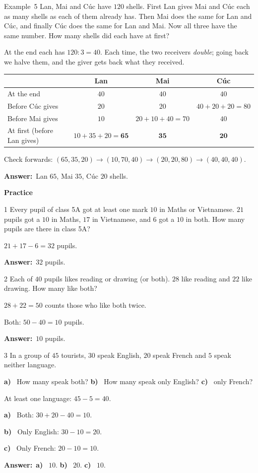 \documentclass[11pt]{article}
\newif\ifsol \solfalse
\renewcommand{\arraystretch}{1.35}
\providecommand{\AnsWord}{Đáp số}
\newcommand{\dapso}[1]{\par\textbf{\AnsWord:}\ #1}
\newcommand{\guide}{\par\vspace{4pt}{\bfseries\color{tmBlue}\GuideWord}\par\vspace{3pt}\nopagebreak}
\newcommand{\probsol}[1]{%
  \begin{lrbox}{\solmeasure}\begin{minipage}{\dimexpr\linewidth-24pt\relax}#1\end{minipage}\end{lrbox}%
  \ifsol
    \begin{solbox}#1\end{solbox}%
  \else
    \setlength{\solht}{\dimexpr\ht\solmeasure+\dp\solmeasure+0.85cm\relax}%
    \ifdim\solht<1.35cm\setlength{\solht}{1.35cm}\fi
    \begin{tcolorbox}[colback=white,colframe=Line,boxrule=0.8pt,arc=5pt,
      left=8pt,right=8pt,top=4pt,bottom=4pt,height=\solht]{\footnotesize\color{Slate}\itshape\WorkWord}\end{tcolorbox}%
  \fi}
\newcommand{\dividerbar}[1]{\par\vspace{0.6em}\noindent
  \begin{tcolorbox}[enhanced,frame hidden,interior hidden,borderline west={5pt}{0pt}{ProbBlue},
    colback=white,left=12pt,right=12pt,top=5pt,bottom=5pt,arc=4pt]
  {\large\bfseries\color{ProbBlue} #1}\end{tcolorbox}\vspace{0.4em}}
\newcommand{\pa}[1]{\textbf{#1)}\ }
\newcommand{\gap}{\vspace{0.3cm}}
\def\GuideWord{Guided solution.}
\def\WorkWord{Your work:}
\def\AnsWord{Answer}
\def\ExWord{Example}
\begin{document}
\gap
\begin{exbox}{\ExWord\ 5}
Lan, Mai and Cúc have $120$ shells. First Lan gives Mai and Cúc each as many shells as each of them already has. Then Mai does the same for Lan and Cúc, and finally Cúc does the same for Lan and Mai. Now all three have the same number. How many shells did each have at first?
\guide
At the end each has $120:3=40$. Each time, the two receivers \emph{double}; going back we halve them, and the giver gets back what they received.
\begin{center}
\renewcommand{\arraystretch}{1.25}
\begin{tabular}{|l|c|c|c|}
\hline
 & Lan & Mai & Cúc\\\hline
At the end & $40$ & $40$ & $40$\\\hline
Before Cúc gives & $20$ & $20$ & $40+20+20=80$\\\hline
Before Mai gives & $10$ & $20+10+40=70$ & $40$\\\hline
At first (before Lan gives) & $10+35+20=\mathbf{65}$ & $\mathbf{35}$ & $\mathbf{20}$\\\hline
\end{tabular}
\end{center}
Check forwards: $(65,35,20)\to(10,70,40)\to(20,20,80)\to(40,40,40)$.
\dapso{Lan $65$, Mai $35$, Cúc $20$ shells.}
\end{exbox}
\dividerbar{Practice}
\begin{probbox}{1}{\relax}
Every pupil of class 5A got at least one mark $10$ in Maths or Vietnamese. $21$ pupils got a $10$ in Maths, $17$ in Vietnamese, and $6$ got a $10$ in both. How many pupils are there in class 5A?
\end{probbox}
\probsol{
$21+17-6=32$ pupils.
\dapso{$32$ pupils.}}
\gap
\begin{probbox}{2}{\relax}
Each of $40$ pupils likes reading or drawing (or both). $28$ like reading and $22$ like drawing. How many like both?
\end{probbox}
\probsol{
$28+22=50$ counts those who like both twice.\par Both: $50-40=10$ pupils.
\dapso{$10$ pupils.}}
\gap
\begin{probbox}{3}{\relax}
In a group of $45$ tourists, $30$ speak English, $20$ speak French and $5$ speak neither language.\par
\pa{a} How many speak both? \quad \pa{b} How many speak only English? \quad \pa{c} only French?
\end{probbox}
\probsol{
At least one language: $45-5=40$.\par
\pa{a} Both: $30+20-40=10$.\par
\pa{b} Only English: $30-10=20$.\par
\pa{c} Only French: $20-10=10$.
\dapso{\pa{a} $10$. \pa{b} $20$. \pa{c} $10$.}}
\end{document}
